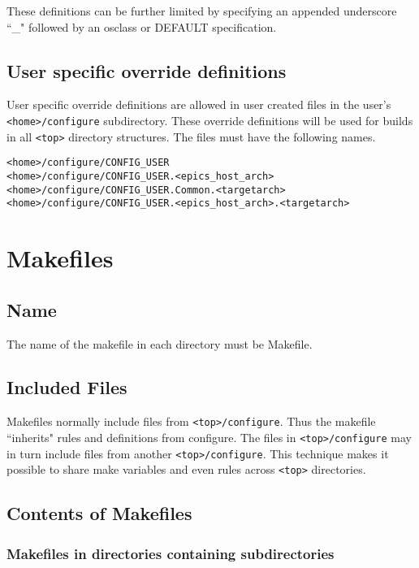These definitions can be further limited by specifying an appended underscore ``\_" followed by an osclass or DEFAULT 
specification.

\subsection{User specific override definitions}

User specific override definitions are allowed in user created files in the user's \verb|<home>/configure| subdirectory. These 
override definitions will be used for builds in all \verb|<top>| directory structures. The files must have the following names. 

\begin{verbatim}
<home>/configure/CONFIG_USER
<home>/configure/CONFIG_USER.<epics_host_arch>
<home>/configure/CONFIG_USER.Common.<targetarch>
<home>/configure/CONFIG_USER.<epics_host_arch>.<targetarch>
\end{verbatim}

\section{Makefiles}

\subsection{Name}

The name of the makefile in each directory must be Makefile.

\subsection{Included Files}

Makefiles normally include files from \verb|<top>/configure|. Thus the makefile ``inherits" rules and definitions from configure. 
The files in \verb|<top>/configure| may in turn include files from another \verb|<top>/configure|. This technique makes it possible to 
share make variables and even rules across \verb|<top>| directories.

\subsection{Contents of Makefiles}

\subsubsection{Makefiles in directories containing subdirectories}

